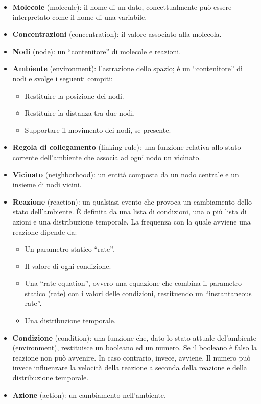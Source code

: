 \documentclass[12pt,a4paper,openright,twoside]{book}
\begin{document}
\begin{itemize}
    \item \textbf{Molecole} (molecule): il nome di un dato, concettualmente può essere interpretato come il nome di una variabile.
    \item \textbf{Concentrazioni} (concentration): il valore associato alla molecola.
    \item \textbf{Nodi} (node): un “contenitore” di molecole e reazioni.
    \item \textbf{Ambiente} (environment): l’astrazione dello spazio; è un “contenitore” di nodi e svolge i seguenti compiti:
    \begin{itemize}
        \item Restituire la posizione dei nodi.
        \item Restituire la distanza tra due nodi.
        \item Supportare il movimento dei nodi, se presente.
    \end{itemize}
    \item \textbf{Regola di collegamento} (linking rule): una funzione relativa allo stato corrente dell’ambiente che associa ad ogni nodo un vicinato.
    \item \textbf{Vicinato} (neighborhood): un entità composta da un nodo centrale e un insieme di nodi vicini.
    \item \textbf{Reazione} (reaction): un qualsiasi evento che provoca un cambiamento dello stato dell’ambiente. È definita da una lista di condizioni, una o più lista di azioni e una distribuzione temporale. La frequenza con la quale avviene una reazione dipende da:
    \begin{itemize}
        \item Un parametro statico “rate”.
        \item Il valore di ogni condizione.
        \item Una “rate equation”, ovvero una equazione che combina il parametro statico (rate) con i valori delle condizioni, restituendo un “instantaneous rate”.
        \item Una distribuzione temporale.
    \end{itemize}
    \item \textbf{Condizione} (condition): una funzione che, dato lo stato attuale del’ambiente (environment), restituisce un booleano ed un numero. Se il booleano è falso la reazione non può avvenire. In caso contrario, invece, avviene. Il numero può invece influenzare la velocità della reazione a seconda della reazione e della distribuzione temporale.
    \item \textbf{Azione} (action): un cambiamento nell’ambiente.
\end{itemize}
\end{document}
